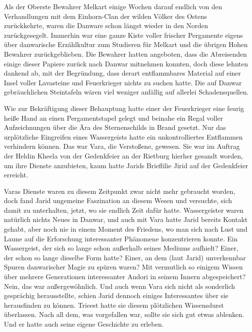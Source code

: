 Als der Oberste Bewahrer Melkart einige Wochen darauf endlich von den Verhandlungen mit dem Einhorn-Clan der wilden Völker des Ostens zurückkehrte, waren die Danware schon längst wieder in den Norden zurückgesegelt. Immerhin war eine ganze Kiste voller frischer Pergamente eigens über danwarische Erzählkultur zum Studieren für Melkart und die übrigen Hohen Bewahrer zurückgeblieben. Die Bewahrer hatten angeboten, dass die Abreisenden einige dieser Papiere zurück nach Danwar mitnehmen konnten, doch diese lehnten dankend ab, mit der Begründung, dass derart entflammbares Material auf einer Insel voller Lavasteine und Feuerkrieger nichts zu suchen hatte. Die auf Danwar gebräuchlichen Steintafeln wären viel weniger anfällig auf allerlei Schadensquellen.

Wie zur Bekräftigung dieser Behauptung hatte einer der Feuerkrieger eine feurig heiße Hand an einen Pergamentstapel gelegt und beinahe ein Regal voller Aufzeichnungen über die Ära des Sternenschilds in Brand gesetzt. Nur das urplötzliche Eingreifen eines Wassergeists hatte ein unkontrolliertes Entflammen verhindern können. Das war Vara, die Verstoßene, gewesen. Sie war im Auftrag der Heldin Kheela von der Gedenkfeier an der Rietburg hierher gesandt worden, um ihre Dienste anzubieten, kaum hatte Jarids Brieflilie Jirid auf der Gedenkfeier erreicht.

Varas Dienste waren zu diesem Zeitpunkt zwar nicht mehr gebraucht worden, doch fand Jarid ungemeine Faszination an diesem Wesen und versuchte, sich damit zu unterhalten, jetzt, wo sie endlich Zeit dafür hatte. Wassergeister waren natürlich nichts Neues in Danwar, und auch mit Vara hatte Jarid bereits Kontakt gehabt, aber noch nie in einem Moment des Friedens, wo man sich nach Lust und Laune auf die Erforschung interessanter Phänomene konzentrieren konnte. Ein Wassergeist, der sich so lange schon außerhalb seines Mediums aufhielt? Einer, der schon so lange dieselbe Form hatte? Einer, an dem (laut Jarid) unverkennbar Spuren danwarischer Magie zu spüren waren? Mit vermutlich so einigem Wissen über mehrere Generationen interessanter Andori in seinem Innern abgespeichert? Nein, das war außergewöhnlich. Und auch wenn Vara sich nicht als sonderlich gesprächig herausstellte, schien Jarid dennoch einiges Interessantes über sie herausfinden zu können. Trieest hatte sie diesem plötzlichen Wissensdurst überlassen. Nach all dem, was vorgefallen war, sollte sie sich gut etwas ablenken. Und er hatte auch seine eigene Geschichte zu erleben.

